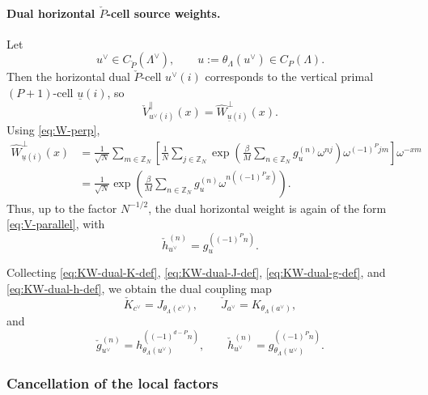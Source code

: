 \documentclass[dvipsnames,a4paper]{article}
\numberwithin{equation}{section}
\theoremstyle{definition}
\theoremstyle{remark}
\begin{document}
\paragraph{Dual horizontal \(\check P\)-cell source weights.}
Let
\begin{equation}
u^\vee\in C_{\check P}(\Lambda^\vee),
\qquad
u:=\theta_\Lambda(u^\vee)\in C_P(\Lambda).
\end{equation}
Then the horizontal dual \(\check P\)-cell \(u^\vee(i)\) corresponds to the vertical primal
\((P+1)\)-cell \(\underline u(i)\), so
\begin{equation}
	\check V_{u^\vee(i)}^{\parallel}(x)
	=
	\widehat W_{\underline u(i)}^{\perp}(x).
\end{equation}
Using \eqref{eq:W-perp},
\begin{align}
	\widehat W_{\underline u(i)}^{\perp}(x)
	&=
	\frac{1}{\sqrt N}\sum_{m\in \mathbb Z_N}
	\left[
	\frac{1}{N}\sum_{j\in\mathbb Z_N}
	\exp \left(\frac{\beta}{M}\sum_{n\in\mathbb Z_N}g_u^{(n)}\omega^{nj}\right)
	\omega^{(-1)^Pjm}
	\right]\omega^{-xm}
	\nonumber\\
	&=
	\frac{1}{\sqrt N}
	\exp \left(\frac{\beta}{M}\sum_{n\in\mathbb Z_N}g_u^{(n)}\omega^{n((-1)^P x)}\right).
	\label{eq:KW-dual-horizontal-V-explicit}
\end{align}
Thus, up to the factor \(N^{-1/2}\), the dual horizontal weight is again of the form
\eqref{eq:V-parallel}, with
\begin{equation}
	\check h_{u^\vee}^{(n)}
	=
	g_{u}^{((-1)^Pn)}.
	\label{eq:KW-dual-h-def}
\end{equation}

Collecting \eqref{eq:KW-dual-K-def}, \eqref{eq:KW-dual-J-def},
\eqref{eq:KW-dual-g-def}, and \eqref{eq:KW-dual-h-def}, we obtain the dual coupling map
\begin{equation}
	\check K_{c^\vee}=J_{\theta_\Lambda(c^\vee)},
	\qquad
	\check J_{a^\vee}=K_{\theta_\Lambda(a^\vee)},
	\label{eq:KW-dual-JK-map}
\end{equation}
and
\begin{equation}
	\check g_{u^\vee}^{(n)}
	=
	h_{\theta_\Lambda(u^\vee)}^{((-1)^{d-P}n)},
	\qquad
	\check h_{u^\vee}^{(n)}
	=
	g_{\theta_\Lambda(u^\vee)}^{((-1)^P n)}.
	\label{eq:KW-dual-gh-map}
\end{equation}

\subsubsection{Cancellation of the local factors}
\end{document}
